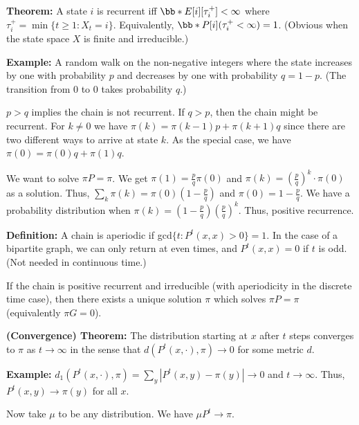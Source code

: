 \documentclass[../../../Master/AppliedStochastics.tex]{subfiles}
\begin{document}
\vspace{5mm}
\textbf{Theorem:} A state $i$ is recurrent iff $\bb* E[i] [\tau_{i}^+]<\infty$ 
where 
$\tau_i^+=\min\{t\geq 1:X_t=i\}$.  Equivalently, $\bb* P[i] 
(\tau_i^+<\infty)=1$. 
(Obvious 
when the state space $X$ is finite and irreducible.)



\vspace{10mm}
\textbf{Example:} A random walk on the non-negative integers where the state 
increases by one with probability $p$ and decreases by one with probability 
$q=1-p$. (The transition from 0 to 0 takes probability $q$.) 

\vspace{5mm}
$p>q$ implies the chain is not recurrent. If $q>p$, then the chain might be 
recurrent. For $k\neq 0$ we have $\pi(k)=\pi(k-1)p+\pi(k+1)q$ since there are 
two different ways to arrive at state $k$. As the special case, we have 
$\pi(0)=\pi(0)q+\pi(1)q$. 

\vspace{5mm}
We want to solve $\pi P=\pi$. We get $\pi(1)=\frac{p}{q}\pi(0)$ and 
$\pi(k)=\left(\frac{p}{q}\right)^k\cdot\pi(0)$ as a solution. Thus, 
$\sum_k\pi(k)=\pi(0)\left(1-\frac{p}{q}\right)$ and $\pi(0)=1-\frac{p}{q}$. We 
have a probability distribution when 
$\pi(k)=\left(1-\frac{p}{q}\right)\left(\frac{p}{q}\right)^k$. Thus, positive 
recurrence.

\vspace{10mm}
\textbf{Definition:} A chain is aperiodic if gcd$\{t:P^t(x,x)>0\}=1$. In the 
case of a bipartite graph, we can only return at even times, and $P^t(x,x)=0$ 
if $t$ is odd. (Not needed in continuous time.)

\vspace{5mm}
If the chain is positive recurrent and irreducible (with aperiodicity in the 
discrete time case), then there exists a unique solution $\pi$ which solves 
$\pi P=\pi$ (equivalently $\pi G=0$).

\vspace{5mm}
\textbf{(Convergence) Theorem:} The distribution starting at $x$ after $t$ 
steps converges to $\pi$ as $t\to \infty$ in the sense that 
$d(P^t(x,\cdot),\pi)\to 
0$ for some metric $d$. 


\vspace{5mm}
\textbf{Example:} $d_1(P^t(x,\cdot),\pi)=\sum_y|P^t(x,y)-\pi(y)|\to 0$ and 
$t\to\infty$. Thus, $P^t(x,y)\to\pi(y)$ for all $x$. 

\vspace{5mm}
Now take $\mu$ to be any distribution. We have $\mu P^t\to \pi$. 
\end{document}
